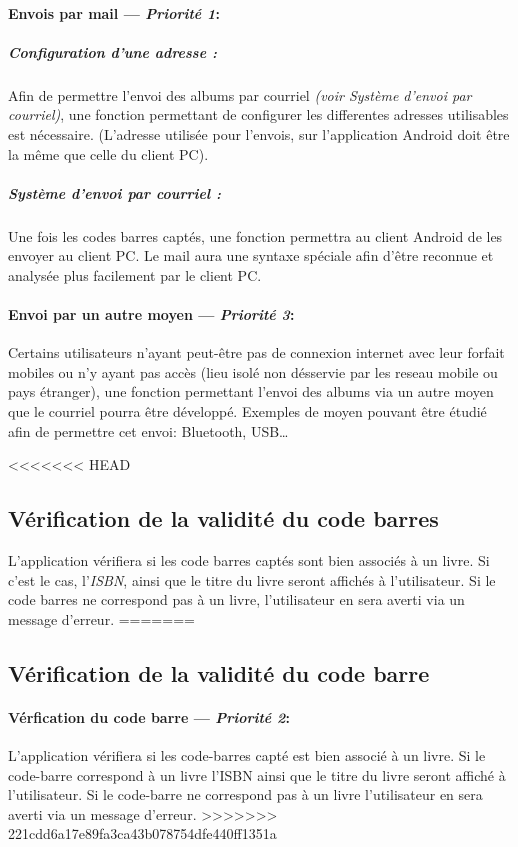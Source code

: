 \paragraph{Envois par mail ---  \textit{Priorité 1}:}
\subparagraph{Configuration d'une adresse :}
Afin de permettre l'envoi des albums par courriel \textit{(voir Système d'envoi par courriel)}, une fonction permettant de configurer les differentes adresses utilisables est nécessaire. (L'adresse utilisée pour l'envois, sur l'application Android doit être la même que celle du client PC).

\subparagraph{Système d'envoi par courriel :} 
Une fois les codes barres captés, une fonction permettra au client Android de les envoyer au client PC. 
Le mail aura une syntaxe spéciale afin d'être reconnue et analysée plus facilement par le client PC. 

\paragraph{Envoi par un autre moyen ---  \textit{Priorité 3}:}
Certains utilisateurs n'ayant peut-être pas de connexion internet avec leur forfait mobiles ou n'y ayant pas accès (lieu isolé non désservie par les reseau mobile ou pays étranger), une fonction permettant l'envoi des albums via un autre moyen que le courriel pourra être développé.
Exemples de moyen pouvant être étudié afin de permettre cet envoi: Bluetooth, USB…

<<<<<<< HEAD
\subsection{Vérification de la validité du code barres}
L'application vérifiera si les code barres captés sont bien associés à un livre.
Si c'est le cas, l'\emph{ISBN}, ainsi que le titre du livre seront affichés à l'utilisateur.
Si le code barres ne correspond pas à un livre, l'utilisateur en sera averti via un message d'erreur.
=======
\subsection{Vérification de la validité du code barre}
\paragraph{Vérfication du code barre ---  \textit{Priorité 2}:} 
L'application vérifiera si les code-barres capté est bien associé à un livre.
Si le code-barre correspond à un livre l'ISBN ainsi que le titre du livre seront affiché à l'utilisateur.
Si le code-barre ne correspond pas à un livre l'utilisateur en sera averti via un message d'erreur.
>>>>>>> 221cdd6a17e89fa3ca43b078754dfe440ff1351a

